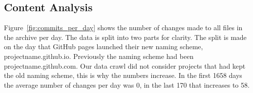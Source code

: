 \documentclass[11pt]{article}
\begin{document}
\subsection{Content Analysis}

Figure~\ref{fig:commits_per_day} shows the number of changes made to all files in the archive per day. The data is split into two parts for clarity. The split is made on the day that GitHub pages launched their new naming scheme, projectname.github.io. Previously the naming scheme had been projectname.github.com. Our data crawl did not consider projects that had kept the old naming scheme, this is why the numbers increase. In the first 1658 days the average number of changes per day was 0, in the last 170 that increases to 58.

\end{document}
